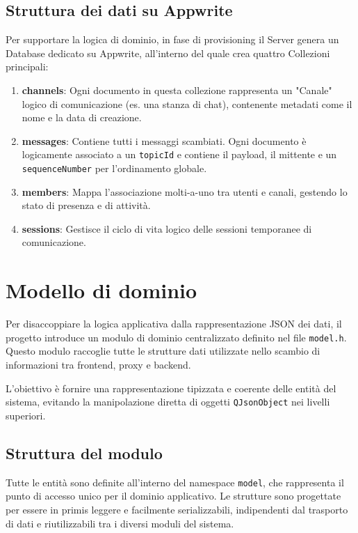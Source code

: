 \documentclass[a4paper, 11pt, twoside]{report}
\begin{document}
\subsection{Struttura dei dati su Appwrite}
Per supportare la logica di dominio, in fase di provisioning il Server genera un Database dedicato su Appwrite, all'interno 
del quale crea quattro Collezioni principali:
\begin{enumerate}
    \item \textbf{channels}: Ogni documento in questa collezione rappresenta un "Canale" logico di comunicazione (es. una 
    stanza di chat), contenente metadati come il nome e la data di creazione.
    
    \item \textbf{messages}: Contiene tutti i messaggi scambiati. Ogni documento è logicamente associato a un \texttt{topicId}
    e contiene il payload, il mittente e un \texttt{sequenceNumber} per l'ordinamento globale.
    
    \item \textbf{members}: Mappa l'associazione molti-a-uno tra utenti e canali, gestendo lo stato di presenza e di attività.
    
    \item \textbf{sessions}: Gestisce il ciclo di vita logico delle sessioni temporanee di comunicazione.
\end{enumerate}

\section{Modello di dominio}

Per disaccoppiare la logica applicativa dalla rappresentazione JSON dei dati, il progetto introduce un modulo di dominio
centralizzato definito nel file \texttt{model.h}. Questo modulo raccoglie tutte le strutture dati utilizzate nello scambio
di informazioni tra frontend, proxy e backend.

L'obiettivo è fornire una rappresentazione tipizzata e coerente delle entità del sistema, evitando la manipolazione 
diretta di oggetti \texttt{QJsonObject} nei livelli superiori.

\subsection{Struttura del modulo}

Tutte le entità sono definite all'interno del namespace \texttt{model}, che rappresenta il punto di accesso unico per 
il dominio applicativo. Le strutture sono progettate per essere in primis leggere e facilmente serializzabili,
indipendenti dal trasporto di dati e riutilizzabili tra i diversi moduli del sistema.
\end{document}
